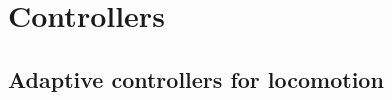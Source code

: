 \documentclass[main]{subfiles}
\begin{document}
\setcounter{chapter}{2}

\chapter{Controllers} %

\label{Chapter\thechapter} %


\section{Adaptive controllers for locomotion}
\end{document}
